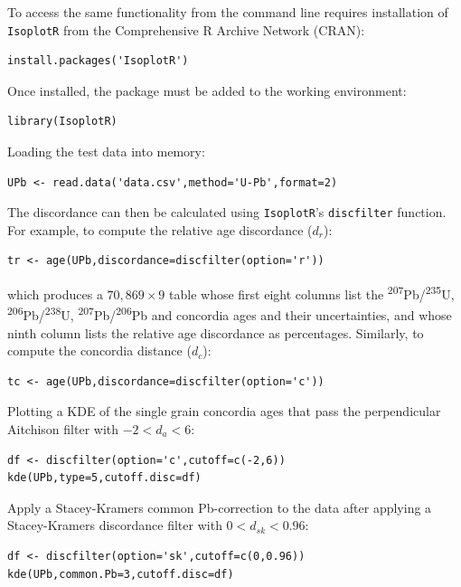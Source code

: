 \documentclass[gchron, manuscript]{copernicus}
\begin{document}
To access the same functionality from the command line requires
installation of \texttt{IsoplotR} from the Comprehensive R Archive
Network (CRAN):

\begin{verbatim}
install.packages('IsoplotR')
\end{verbatim}

\noindent Once installed, the package must be added to the working
environment:

\begin{verbatim}
library(IsoplotR)
\end{verbatim}

\noindent Loading the test data into memory:

\begin{verbatim}
UPb <- read.data('data.csv',method='U-Pb',format=2)
\end{verbatim}

\noindent The discordance can then be calculated using
\texttt{IsoplotR}'s \texttt{discfilter} function. For example, to
compute the relative age discordance ($d_r$):

\begin{verbatim}
tr <- age(UPb,discordance=discfilter(option='r'))
\end{verbatim}

\noindent which produces a ${70,869}\times{9}$ table whose first eight
columns list the \textsuperscript{207}Pb/\textsuperscript{235}U,
\textsuperscript{206}Pb/\textsuperscript{238}U,
\textsuperscript{207}Pb/\textsuperscript{206}Pb and concordia ages and
their uncertainties, and whose ninth column lists the relative age
discordance as percentages. Similarly, to compute the concordia
distance ($d_c$):

\begin{verbatim}
tc <- age(UPb,discordance=discfilter(option='c'))
\end{verbatim}

\noindent Plotting a KDE of the single grain concordia ages that pass
the perpendicular Aitchison filter with ${-2}<{d_a}<{6}$:

\begin{verbatim}
df <- discfilter(option='c',cutoff=c(-2,6))
kde(UPb,type=5,cutoff.disc=df)
\end{verbatim}

\noindent Apply a Stacey-Kramers common Pb-correction to the data
after applying a Stacey-Kramers discordance filter with
${0}<{d_{sk}}<{0.96}$:

\begin{verbatim}
df <- discfilter(option='sk',cutoff=c(0,0.96))
kde(UPb,common.Pb=3,cutoff.disc=df)
\end{verbatim}
\end{document}
